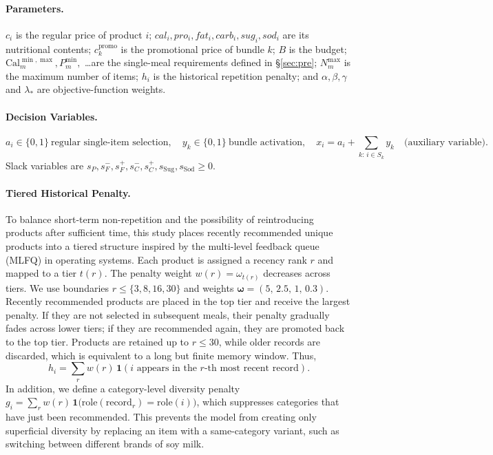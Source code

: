 \documentclass[a4paper]{article}
\begin{document}
\paragraph{Parameters.}$c_i$ is the regular price of product $i$; $cal_i,pro_i,fat_i,carb_i,sug_i,sod_i$ are its nutritional contents; $c_k^{\text{promo}}$ is the promotional price of bundle $k$; $B$ is the budget; $\text{Cal}^{\min,\max}_m, P^{\min}_m,$ \dots are the single-meal requirements defined in \S\ref{sec:pre}; $N^{\max}_m$ is the maximum number of items; $h_i$ is the historical repetition penalty; and $\alpha,\beta,\gamma$ and $\lambda_*$ are objective-function weights.

\paragraph{Decision Variables.}\leavevmode
\[
a_i \in \{0,1\}\ \text{regular single-item selection}, \quad
y_k \in \{0,1\}\ \text{bundle activation}, \quad
x_i = a_i + \sum_{k:\,i\in S_k} y_k \quad\text{(auxiliary variable)}.
\]
Slack variables are $s_P, s^-_{F}, s^+_{F}, s^-_{C}, s^+_{C}, s_{\text{Sug}}, s_{\text{Sod}} \ge 0$.

\paragraph{Tiered Historical Penalty.}To balance short-term non-repetition and the possibility of reintroducing products after sufficient time, this study places recently recommended unique products into a tiered structure inspired by the multi-level feedback queue (MLFQ) in operating systems. Each product is assigned a recency rank $r$ and mapped to a tier $t(r)$. The penalty weight $w(r)=\omega_{t(r)}$ decreases across tiers. We use boundaries $r\le\{3,8,16,30\}$ and weights $\boldsymbol{\omega}=(5,\,2.5,\,1,\,0.3)$. Recently recommended products are placed in the top tier and receive the largest penalty. If they are not selected in subsequent meals, their penalty gradually fades across lower tiers; if they are recommended again, they are promoted back to the top tier. Products are retained up to $r\le 30$, while older records are discarded, which is equivalent to a long but finite memory window. Thus,
\[ h_i = \sum_{r} w(r)\,\mathbf{1}(i\text{ appears in the }r\text{-th most recent record}). \]
In addition, we define a category-level diversity penalty $g_i = \sum_{r} w(r)\,\mathbf{1}\!\big(\mathrm{role}(\text{record}_r)=\mathrm{role}(i)\big)$, which suppresses categories that have just been recommended. This prevents the model from creating only superficial diversity by replacing an item with a same-category variant, such as switching between different brands of soy milk.
\end{document}
